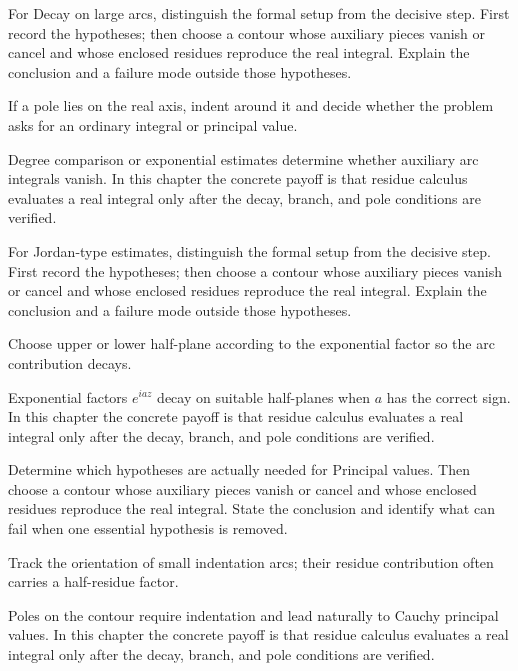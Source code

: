 \begin{exercise}\label{exr:iv11-03}
For Decay on large arcs, distinguish the formal setup from the decisive step. First record the hypotheses; then choose a contour whose auxiliary pieces vanish or cancel and whose enclosed residues reproduce the real integral. Explain the conclusion and a failure mode outside those hypotheses.
\end{exercise}
\begin{hint}
If a pole lies on the real axis, indent around it and decide whether the problem asks for an ordinary integral or principal value.
\end{hint}
\begin{solution}
Degree comparison or exponential estimates determine whether auxiliary arc integrals vanish. In this chapter the concrete payoff is that residue calculus evaluates a real integral only after the decay, branch, and pole conditions are verified.
\end{solution}

\begin{exercise}\label{exr:iv11-04}
For Jordan-type estimates, distinguish the formal setup from the decisive step. First record the hypotheses; then choose a contour whose auxiliary pieces vanish or cancel and whose enclosed residues reproduce the real integral. Explain the conclusion and a failure mode outside those hypotheses.
\end{exercise}
\begin{hint}
Choose upper or lower half-plane according to the exponential factor so the arc contribution decays.
\end{hint}
\begin{solution}
Exponential factors $e^{iaz}$ decay on suitable half-planes when $a$ has the correct sign. In this chapter the concrete payoff is that residue calculus evaluates a real integral only after the decay, branch, and pole conditions are verified.
\end{solution}

\begin{exercise}\label{exr:iv11-05}
Determine which hypotheses are actually needed for Principal values. Then choose a contour whose auxiliary pieces vanish or cancel and whose enclosed residues reproduce the real integral. State the conclusion and identify what can fail when one essential hypothesis is removed.
\end{exercise}
\begin{hint}
Track the orientation of small indentation arcs; their residue contribution often carries a half-residue factor.
\end{hint}
\begin{solution}
Poles on the contour require indentation and lead naturally to Cauchy principal values. In this chapter the concrete payoff is that residue calculus evaluates a real integral only after the decay, branch, and pole conditions are verified.
\end{solution}


